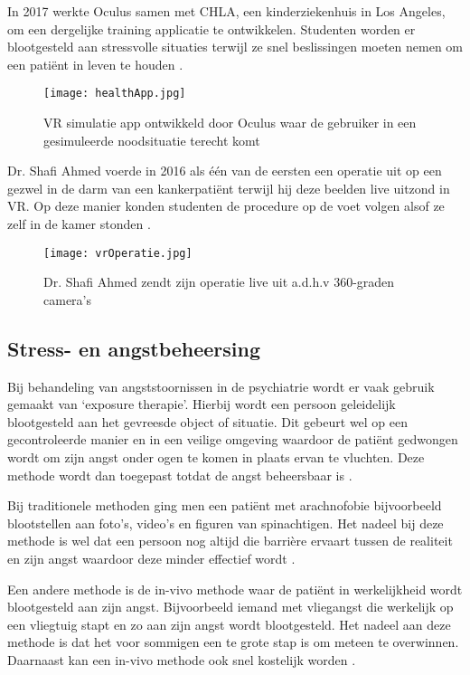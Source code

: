 In 2017 werkte Oculus samen met CHLA, een kinderziekenhuis in Los Angeles, om een dergelijke training applicatie te ontwikkelen. Studenten worden er blootgesteld aan stressvolle situaties terwijl ze snel beslissingen moeten nemen om een patiënt in leven te houden \autocite{Adobe2018}.

\begin{figure}[h]
    \centering
    \texttt{[image: healthApp.jpg]}
    \caption{VR simulatie app ontwikkeld door Oculus waar de gebruiker in een gesimuleerde noodsituatie terecht komt \autocite{Adobe2018}}
\end{figure}

Dr. Shafi Ahmed voerde in 2016  als één van de eersten een operatie uit op een gezwel in de darm van een kankerpatiënt terwijl hij deze beelden live uitzond in VR. Op deze manier konden studenten de procedure op de voet volgen alsof ze zelf in de kamer stonden \autocite{Pelta2017}.

\begin{figure}[h]
    \centering
    \texttt{[image: vrOperatie.jpg]}
    \caption{Dr. Shafi Ahmed zendt zijn operatie live uit a.d.h.v 360-graden camera's \autocite{Realities2019}}
\end{figure}

\subsection{Stress- en angstbeheersing}  
Bij behandeling van angststoornissen in de psychiatrie wordt er vaak gebruik gemaakt van ‘exposure therapie’. Hierbij wordt een persoon geleidelijk blootgesteld aan het gevreesde object of situatie. Dit gebeurt wel op een gecontroleerde manier en in een veilige omgeving waardoor de patiënt gedwongen wordt om zijn angst onder ogen te komen in plaats ervan te vluchten. Deze methode wordt dan toegepast totdat de angst beheersbaar is \autocite{Keller2018}. 

Bij traditionele methoden ging men een patiënt met arachnofobie bijvoorbeeld blootstellen aan foto’s, video’s en figuren van spinachtigen. Het nadeel bij deze methode is wel dat een persoon nog altijd die barrière ervaart tussen de realiteit en zijn angst waardoor deze minder effectief wordt \autocite{Keller2018}.

Een andere methode is de in-vivo methode waar de patiënt in werkelijkheid wordt blootgesteld aan zijn angst. Bijvoorbeeld iemand met vliegangst die werkelijk op een vliegtuig stapt en zo aan zijn angst wordt blootgesteld. Het nadeel aan deze methode is dat het voor sommigen een te grote stap is om meteen te overwinnen. Daarnaast kan een in-vivo methode ook snel kostelijk worden \autocite{Keller2018}.

